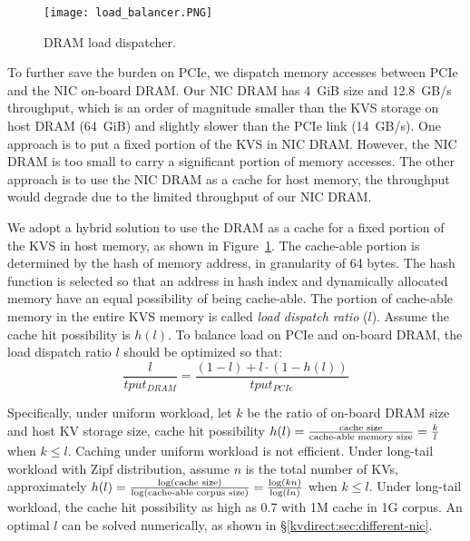 \begin{figure}[t]
\centering
\texttt{[image: load\_balancer.PNG]}
\caption{DRAM load dispatcher.}
\label{kvdirect:fig:cache}

\end{figure}

To further save the burden on PCIe, we dispatch memory accesses between PCIe and the NIC on-board DRAM.
Our NIC DRAM has 4~GiB size and 12.8~GB/s throughput, which is an order of magnitude smaller than the KVS storage on host DRAM (64~GiB) and slightly slower than the PCIe link (14~GB/s).
One approach is to put a fixed portion of the KVS in NIC DRAM. However, the NIC DRAM is too small to carry a significant portion of memory accesses.
The other approach is to use the NIC DRAM as a cache for host memory, the throughput would degrade due to the limited throughput of our NIC DRAM.

We adopt a hybrid solution to use the DRAM as a cache for a fixed portion of the KVS in host memory, as shown in Figure~\ref{kvdirect:fig:cache}.
The cache-able portion is determined by the hash of memory address, in granularity of 64 bytes. The hash function is selected so that an address in hash index and dynamically allocated memory have an equal possibility of being cache-able.
The portion of cache-able memory in the entire KVS memory is called \textit{load dispatch ratio} ($l$).
Assume the cache hit possibility is $h(l)$.
To balance load on PCIe and on-board DRAM, the load dispatch ratio $l$ should be optimized so that:
$$\frac{l}{tput_{DRAM}} = \frac{(1-l) + l \cdot (1-h(l))}{tput_{PCIe}}$$

Specifically, under uniform workload, let $k$ be the ratio of on-board DRAM size and host KV storage size, cache hit possibility $h(l) = \frac{\textnormal{cache size}}{\textnormal{cache-able memory size}} = \frac{k}{l}$ when $k \leq l$.
Caching under uniform workload is not efficient.
Under long-tail workload with Zipf distribution, assume $n$ is the total number of KVs, approximately $h(l) = \frac{\log (\textnormal{cache size})}{\log (\textnormal{cache-able corpus size})} = \frac{\log (kn)}{\log (ln)}$ when $k \leq l$.
Under long-tail workload, the cache hit possibility as high as 0.7 with 1M cache in 1G corpus.
An optimal $l$ can be solved numerically, as shown in \S\ref{kvdirect:sec:different-nic}.

